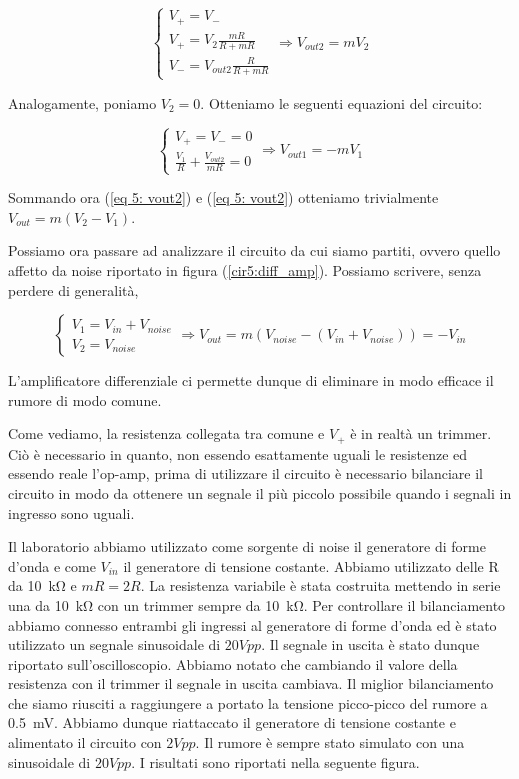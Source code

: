 \begin{equation}
\begin{cases} V_+=V_-  \\ V_+=V_2\frac{mR}{R+mR} \\ V_-= V_{out2}\frac{R}{R+mR}\end{cases}  \Rightarrow V_{out2}=mV_2
\label{eq 5: vout2}
\end{equation}


Analogamente, poniamo $V_2=0$. Otteniamo le seguenti equazioni del circuito:


\begin{equation}
\begin{cases} V_+=V_-=0  \\ \frac{V_1}{R}+\frac{V_{out2}}{mR}=0 \end{cases}  \Rightarrow V_{out1}=-mV_1
\label{eq 5: vout1}
\end{equation}


Sommando ora (\ref{eq 5: vout2}) e (\ref{eq 5: vout2}) otteniamo trivialmente $V_{out}=m(V_2-V_1)$.


Possiamo ora passare ad analizzare il circuito da cui siamo partiti, ovvero quello affetto da noise riportato in figura (\ref{cir5:diff_amp}). Possiamo scrivere, senza perdere di generalità,

$$
\begin{cases} V_1=V_{in}+V_{noise} \\ V_2=V_{noise} \end{cases}  \Rightarrow V_{out}=m(V_{noise}-(V_{in}+V_{noise}))=-V_{in}
$$

L'amplificatore differenziale ci permette dunque di eliminare in modo efficace il rumore di modo comune. 

Come vediamo, la resistenza collegata tra comune e $V_+$ è in realtà un trimmer. Ciò è necessario in quanto, non essendo esattamente uguali le resistenze ed essendo reale l'op-amp, prima di utilizzare il circuito è necessario bilanciare il circuito in modo da ottenere un segnale il più piccolo possibile quando i segnali in ingresso sono uguali. 

Il laboratorio abbiamo utilizzato come sorgente di noise il generatore di forme d'onda e come $V_{in}$ il generatore di tensione costante. Abbiamo utilizzato delle R da \SI{10}{\kilo\ohm} e $mR=2R$. La resistenza variabile è stata costruita mettendo in serie una da \SI{10}{\kilo\ohm} con un trimmer sempre da \SI{10}{\kilo\ohm}. Per controllare il bilanciamento abbiamo connesso entrambi gli ingressi al generatore di forme d'onda ed è stato utilizzato un segnale sinusoidale di $20Vpp$. Il segnale in uscita è stato dunque riportato sull'oscilloscopio. Abbiamo notato che cambiando il valore della resistenza con il trimmer il segnale in uscita cambiava. Il miglior bilanciamento che siamo riusciti a raggiungere a portato la tensione picco-picco del rumore a \SI{0.5}{\milli\volt}. Abbiamo dunque riattaccato il generatore di tensione costante e alimentato il circuito con $2Vpp$. Il rumore è sempre stato simulato con una sinusoidale di $20Vpp$. I risultati sono riportati nella seguente figura.



